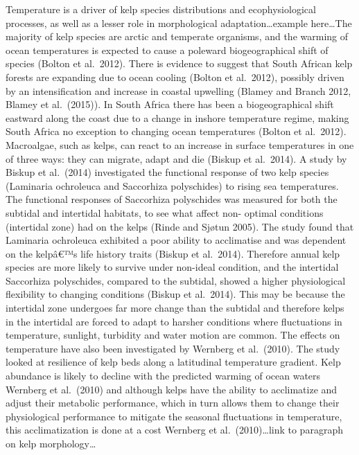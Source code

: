 \documentclass[]{article}
\begin{document}
Temperature is a driver of kelp species distributions and
ecophysiological processes, as well as a lesser role in morphological
adaptation\ldots{}example here\ldots{}The majority of kelp species are
arctic and temperate organisms, and the warming of ocean temperatures is
expected to cause a poleward biogeographical shift of species (Bolton et
al.~2012). There is evidence to suggest that South African kelp forests
are expanding due to ocean cooling (Bolton et al.~2012), possibly driven
by an intensification and increase in coastal upwelling (Blamey and
Branch 2012, Blamey et al.~(2015)). In South Africa there has been a
biogeographical shift eastward along the coast due to a change in
inshore temperature regime, making South Africa no exception to changing
ocean temperatures (Bolton et al.~2012). Macroalgae, such as kelps, can
react to an increase in surface temperatures in one of three ways: they
can migrate, adapt and die (Biskup et al.~2014). A study by Biskup et
al.~(2014) investigated the functional response of two kelp species
(Laminaria ochroleuca and Saccorhiza polyschides) to rising sea
temperatures. The functional responses of Saccorhiza polyschides was
measured for both the subtidal and intertidal habitats, to see what
affect non- optimal conditions (intertidal zone) had on the kelps (Rinde
and Sjøtun 2005). The study found that Laminaria ochroleuca exhibited a
poor ability to acclimatise and was dependent on the kelpâ€™s life
history traits (Biskup et al.~2014). Therefore annual kelp species are
more likely to survive under non-ideal condition, and the intertidal
Saccorhiza polyschides, compared to the subtidal, showed a higher
physiological flexibility to changing conditions (Biskup et al.~2014).
This may be because the intertidal zone undergoes far more change than
the subtidal and therefore kelps in the intertidal are forced to adapt
to harsher conditions where fluctuations in temperature, sunlight,
turbidity and water motion are common. The effects on temperature have
also been investigated by Wernberg et al.~(2010). The study looked at
resilience of kelp beds along a latitudinal temperature gradient. Kelp
abundance is likely to decline with the predicted warming of ocean
waters Wernberg et al.~(2010) and although kelps have the ability to
acclimatize and adjust their metabolic performance, which in turn allows
them to change their physiological performance to mitigate the seasonal
fluctuations in temperature, this acclimatization is done at a cost
Wernberg et al.~(2010)\ldots{}link to paragraph on kelp
morphology\ldots{}
\end{document}
